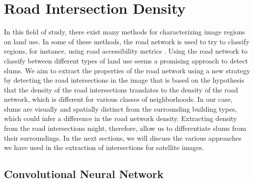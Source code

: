 \section{Road Intersection Density}

In this field of study, there exist many methods for characterizing image regions on land use. In some of these methods, the road network is used to try to classify regions, for instance, using road accessibility metrics \cite{owen2013approach}. Using the road network to classify between different types of land use seems a promising approach to detect slums. We aim to extract the properties of the road network using a new strategy by detecting the road intersections in the image that is based on the hypothesis that the density of the road intersections translates to the density of the road network, which is different for various classes of neighborhoods. In our case, slums are visually and spatially distinct from the surrounding building types, which could infer a difference in the road network density. Extracting density from the road intersections might, therefore, allow us to differentiate slums from their surroundings. In the next sections, we will discuss the various approaches we have used in the extraction of intersections for satellite images.



\subsection{Convolutional Neural Network}

